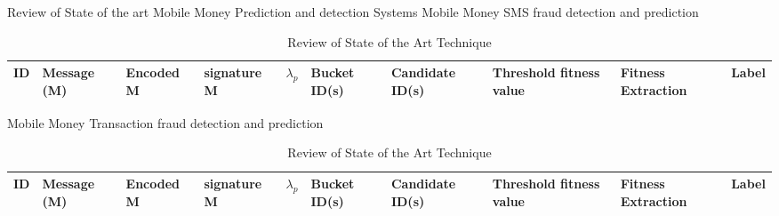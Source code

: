\documentclass[11pt,aspectratio=169]{beamer}
\begin{document}
		
		
			\begin{frame}{Review of State of the art Mobile Money Prediction and detection Systems}
				\small{Mobile Money SMS fraud detection and prediction}
			\begin{table}
				\begin{center}
					{\tiny
						\begin{tabular}{ | m{0.2cm} | m{1 cm} | m{1 cm} | m{1 cm} | m{1 cm} | m{1 cm} | m{1 cm} | m{1 cm} |m{1 cm} | m{1 cm} |}  
							\hline
							ID &Message (M) & Encoded M & signature M & $\lambda_p$ & Bucket ID(s) & Candidate ID(s) & Threshold fitness value & Fitness Extraction & Label \\
							\hline
						
						\end{tabular}
					}
				\end{center}
				\caption{Review of State of the Art Technique}
				\label{table 1}
			\end{table}
		
		\small{Mobile Money Transaction fraud detection and prediction}
			\begin{table}
			\begin{center}
				{\tiny
					\begin{tabular}{ | m{0.2cm} | m{1 cm} | m{1 cm} | m{1 cm} | m{1 cm} | m{1 cm} | m{1 cm} | m{1 cm} |m{1 cm} | m{1 cm} |}  
						\hline
						ID &Message (M) & Encoded M & signature M & $\lambda_p$ & Bucket ID(s) & Candidate ID(s) & Threshold fitness value & Fitness Extraction & Label \\
						\hline
						
					\end{tabular}
				}
			\end{center}
			\caption{Review of State of the Art Technique}
			\label{table 1}
		\end{table}
		\end{frame}
		
		
		
\end{document}
